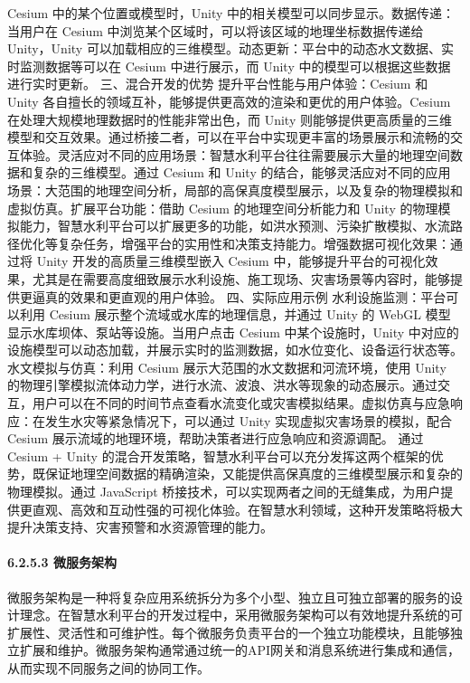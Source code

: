 {Cesium 中的某个位置或模型时，Unity 中的相关模型可以同步显示。数据传递：当用户在 Cesium 中浏览某个区域时，可以将该区域的地理坐标数据传递给 Unity，Unity
可以加载相应的三维模型。动态更新：平台中的动态水文数据、实时监测数据等可以在 Cesium 中进行展示，而 Unity 中的模型可以根据这些数据进行实时更新。 三、混合开发的优势 提升平台性能与用户体验：Cesium 和 Unity
各自擅长的领域互补，能够提供更高效的渲染和更优的用户体验。Cesium 在处理大规模地理数据时的性能非常出色，而 Unity
则能够提供更高质量的三维模型和交互效果。通过桥接二者，可以在平台中实现更丰富的场景展示和流畅的交互体验。灵活应对不同的应用场景：智慧水利平台往往需要展示大量的地理空间数据和复杂的三维模型。通过 Cesium 和 Unity
的结合，能够灵活应对不同的应用场景：大范围的地理空间分析，局部的高保真度模型展示，以及复杂的物理模拟和虚拟仿真。扩展平台功能：借助 Cesium 的地理空间分析能力和 Unity
的物理模拟能力，智慧水利平台可以扩展更多的功能，如洪水预测、污染扩散模拟、水流路径优化等复杂任务，增强平台的实用性和决策支持能力。增强数据可视化效果：通过将 Unity 开发的高质量三维模型嵌入 Cesium
中，能够提升平台的可视化效果，尤其是在需要高度细致展示水利设施、施工现场、灾害场景等内容时，能够提供更逼真的效果和更直观的用户体验。 四、实际应用示例 水利设施监测：平台可以利用 Cesium 展示整个流域或水库的地理信息，并通过
Unity 的 WebGL 模型显示水库坝体、泵站等设施。当用户点击 Cesium 中某个设施时，Unity 中对应的设施模型可以动态加载，并展示实时的监测数据，如水位变化、设备运行状态等。水文模拟与仿真：利用 Cesium
展示大范围的水文数据和河流环境，使用 Unity 的物理引擎模拟流体动力学，进行水流、波浪、洪水等现象的动态展示。通过交互，用户可以在不同的时间节点查看水流变化或灾害模拟结果。虚拟仿真与应急响应：在发生水灾等紧急情况下，可以通过 Unity
实现虚拟灾害场景的模拟，配合 Cesium 展示流域的地理环境，帮助决策者进行应急响应和资源调配。 通过 Cesium + Unity
的混合开发策略，智慧水利平台可以充分发挥这两个框架的优势，既保证地理空间数据的精确渲染，又能提供高保真度的三维模型展示和复杂的物理模拟。通过 JavaScript
桥接技术，可以实现两者之间的无缝集成，为用户提供更直观、高效和互动性强的可视化体验。在智慧水利领域，这种开发策略将极大提升决策支持、灾害预警和水资源管理的能力。 \paragraph{6.2.5.3
微服务架构}\label{ux5faeux670dux52a1ux67b6ux6784}
微服务架构是一种将复杂应用系统拆分为多个小型、独立且可独立部署的服务的设计理念。在智慧水利平台的开发过程中，采用微服务架构可以有效地提升系统的可扩展性、灵活性和可维护性。每个微服务负责平台的一个独立功能模块，且能够独立扩展和维护。微服务架构通常通过统一的API网关和消息系统进行集成和通信，从而实现不同服务之间的协同工作。
}
